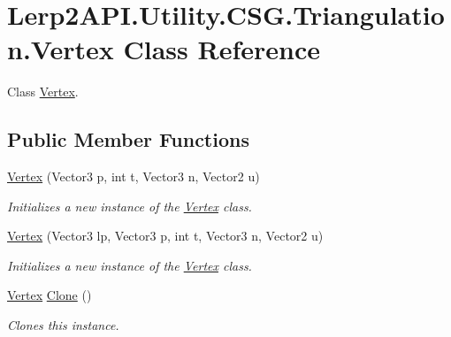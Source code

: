 \hypertarget{class_lerp2_a_p_i_1_1_utility_1_1_c_s_g_1_1_triangulation_1_1_vertex}{}\section{Lerp2\+A\+P\+I.\+Utility.\+C\+S\+G.\+Triangulation.\+Vertex Class Reference}
\label{class_lerp2_a_p_i_1_1_utility_1_1_c_s_g_1_1_triangulation_1_1_vertex}


Class \hyperlink{class_lerp2_a_p_i_1_1_utility_1_1_c_s_g_1_1_triangulation_1_1_vertex}{Vertex}.  


\subsection*{Public Member Functions}
\begin{DoxyCompactItemize}
\item 
\hyperlink{class_lerp2_a_p_i_1_1_utility_1_1_c_s_g_1_1_triangulation_1_1_vertex_a4927fc12e4cede66025a1ba156df0ca6}{Vertex} (Vector3 p, int t, Vector3 n, Vector2 u)
\begin{DoxyCompactList}\small\item\em Initializes a new instance of the \hyperlink{class_lerp2_a_p_i_1_1_utility_1_1_c_s_g_1_1_triangulation_1_1_vertex}{Vertex} class. \end{DoxyCompactList}\item 
\hyperlink{class_lerp2_a_p_i_1_1_utility_1_1_c_s_g_1_1_triangulation_1_1_vertex_ae58d31fa82d3456a5afb813df2ce3506}{Vertex} (Vector3 lp, Vector3 p, int t, Vector3 n, Vector2 u)
\begin{DoxyCompactList}\small\item\em Initializes a new instance of the \hyperlink{class_lerp2_a_p_i_1_1_utility_1_1_c_s_g_1_1_triangulation_1_1_vertex}{Vertex} class. \end{DoxyCompactList}\item 
\hyperlink{class_lerp2_a_p_i_1_1_utility_1_1_c_s_g_1_1_triangulation_1_1_vertex}{Vertex} \hyperlink{class_lerp2_a_p_i_1_1_utility_1_1_c_s_g_1_1_triangulation_1_1_vertex_ab80431eb2f2dff889e5ffab99390810b}{Clone} ()
\begin{DoxyCompactList}\small\item\em Clones this instance. \end{DoxyCompactList}\end{DoxyCompactItemize}
